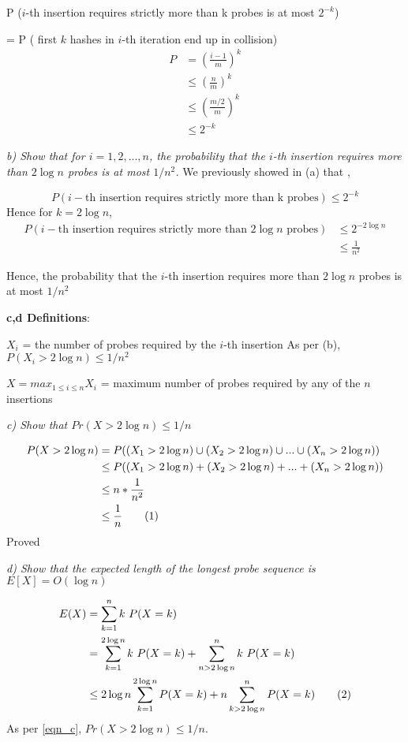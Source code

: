 \documentclass{homeworg}
\newcommand\numberthis{\addtocounter{equation}{1}\tag{\theequation}}
\begin{document}
P ($i$-th insertion requires strictly more than k probes is at most $2^{-k}$)

= P ( first $k$ hashes in $i$-th iteration end up in collision)
\begin{align*}
P &=\left(\frac{i-1}{m}\right)^k\\
&\le \left(\frac{n}{m}\right)^k\\
&\le \left(\frac{m/2}{m}\right)^k\\
&\le 2^{-k}
\end{align*}

\emph{b) Show that for $i =1, 2,. .., n$, the probability that the $i$-th insertion requires more than $2 \log n$ probes is at most $1/n^2$.}
We previously showed in (a) that ,

$$P (i-\text{th insertion requires strictly more than k probes}) \le 2^{-k}$$
Hence for $k = 2 \log n$,
\begin{align*}
    P (i-\text{th insertion requires strictly more than $2 \log n $ probes})&\le 2^{-2 \log n}\\
    &\le \frac{1}{n^2} 
\end{align*}

Hence, the probability that the $i$-th insertion requires more than $2 \log n$ probes is at most $1/n^2$


\textbf{c,d Definitions}:

$X_i$ = the number of probes required by the $i$-th insertion
As per (b), $P({X_i > 2 \log n}) \le 1/n^2$ 

$X = max_{1\le i\le n} X_i$ = maximum number of probes required by any of the $n$ insertions

\emph{c) Show that $Pr({X> 2 \log n}) \le 1/n$}

\begin{align*}
    P({X> 2 \log n}) &= P((X_1> 2 \log n) \cup (X_2> 2 \log n) \cup... \cup (X_n> 2 \log n)) \\
    &\le P((X_1> 2 \log n) + (X_2> 2 \log n) +... + (X_n> 2 \log n)) \\
    &\le n \ast  \frac{1}{n^2} \\
    &\le \frac{1}{n} \numberthis \label{eqn_c}
\end{align*}
Proved

\emph{d) Show that the expected length of the longest probe sequence is $E[X]= O(\log n)$}

\begin{align*}
    E(X) &= \sum_{k=1}^n k \ P(X=k)\\
    &= \sum_{k=1}^{2 \log n} k \ P(X=k) + \sum_{n > 2 \log n }^n k \ P(X=k)\\
    &\le 2 \log n \sum_{k=1}^{2\log n} P(X=k) + n \sum_{k > 2\log n}^n P(X=k) \numberthis \label{eqn_d1}
\end{align*}
As per \ref{eqn_c}, $Pr({X> 2 \log n}) \le 1/n$.
\end{document}

